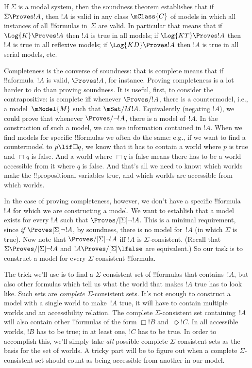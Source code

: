 \documentclass[../../../include/open-logic-section]{subfiles}
\begin{document}


If $\Sigma$ is a modal system, then the soundness theorem establishes
that if $\Sigma \Proves !A$, then $!A$ is valid in any class
$\mClass{C}$ of models in which all instances of all !!{formula}s
in~$\Sigma$ are valid. In particular that means that if $\Log{K}
\Proves !A$ then $!A$ is true in all models; if $\Log{KT} \Proves !A$
then $!A$ is true in all reflexive models; if $\Log{KD} \Proves !A$
then $!A$ is true in all serial models, etc.

Completeness is the converse of soundness: that  is complete
means that if !!a{formula}~$!A$ is valid, $\Proves !A$, for instance.
Proving completeness is a lot harder to do than proving soundness.  It
is useful, first, to consider the contrapositive:  is complete
iff whenever $\Proves/ !A$, there is a countermodel, i.e., a
model~$\mModel{M}$ such that $\mSat/{M}{!A}$. Equivalently (negating
$!A$), we could prove that whenever $\Proves/ \lnot !A$, there is a
model of~$!A$.  In the construction of such a model, we can use
information contained in $!A$.  When we find models for specific
!!{formula}s we often do the same: e.g., if we want to find a
countermodel to $p \lif \Box q$, we know that it has to contain a
world where $p$ is true and $\Box q$ is false. And a world where $\Box
q$ is false means there has to be a world accessible from it where $q$
is false. And that's all we need to know: which worlds make the
!!{propositional variable}s true, and which worlds are accessible from
which worlds.

In the case of proving completeness, however, we don't have a specific
!!{formula}~$!A$ for which we are constructing a model. We want to
establish that a model exists for every $!A$ such that
$\Proves/[\Sigma] \lnot !A$. This is a minimal requirement, since
\emph{if} $\Proves[\Sigma] \lnot !A$, by soundness, there is no model
for~$!A$ (in which $\Sigma$ is true).  Now note that $\Proves/[\Sigma]
\lnot !A$ iff $!A$ is $\Sigma$-consistent.  (Recall that $\Sigma
\Proves/[\Sigma] \lnot !A$ and $!A \Proves/[\Sigma] \lfalse$ are
equivalent.)  So our task is to construct a model for every
$\Sigma$-consistent !!{formula}.

The trick we'll use is to find a $\Sigma$-consistent set of
!!{formula}s that contains~$!A$, but also other formulas which tell us
what the world that makes $!A$ true has to look like. Such sets are
\emph{complete} $\Sigma$-consistent sets. It's not enough to
construct a model with a single world to make~$!A$ true, it will have
to contain multiple worlds and an accessibility relation. The complete
$\Sigma$-consistent set containing~$!A$ will also contain other
!!{formula}s of the form $\Box !B$ and~$\Diamond !C$. In all
accessible worlds, $!B$ has to be true; in at least one, $!C$ has to
be true. In order to accomplish this, we'll simply take \emph{all}
possible complete $\Sigma$-consistent sets as the basis for the set of
worlds. A tricky part will be to figure out when a complete
$\Sigma$-consistent set should count as being accessible from another
in our model.
\end{document}
